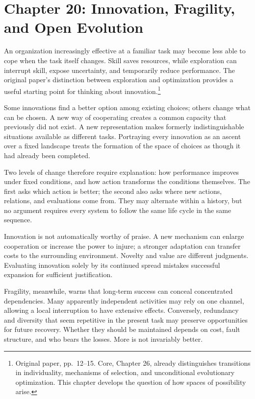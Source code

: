 \documentclass[
  english,
  11pt,
  oneside]{book}
\begin{document}
\par\endgroup

\chapter{Chapter 20: Innovation, Fragility, and Open Evolution}\label{ph-ch-20}

An organization increasingly effective at a familiar task may become less able to cope when the task itself changes. Skill saves resources, while exploration can interrupt skill, expose uncertainty, and temporarily reduce performance. The original paper's distinction between exploration and optimization provides a useful starting point for thinking about innovation.\footnote{\hypertarget{ph-note-50}{}Original paper, pp.~12--15. Core, Chapter 26, already distinguishes transitions in individuality, mechanisms of selection, and unconditional evolutionary optimization. This chapter develops the question of how spaces of possibility arise.}

Some innovations find a better option among existing choices; others change what can be chosen. A new way of cooperating creates a common capacity that previously did not exist. A new representation makes formerly indistinguishable situations available as different tasks. Portraying every innovation as an ascent over a fixed landscape treats the formation of the space of choices as though it had already been completed.

Two levels of change therefore require explanation: how performance improves under fixed conditions, and how action transforms the conditions themselves. The first asks which action is better; the second also asks where new actions, relations, and evaluations come from. They may alternate within a history, but no argument requires every system to follow the same life cycle in the same sequence.

Innovation is not automatically worthy of praise. A new mechanism can enlarge cooperation or increase the power to injure; a stronger adaptation can transfer costs to the surrounding environment. Novelty and value are different judgments. Evaluating innovation solely by its continued spread mistakes successful expansion for sufficient justification.

Fragility, meanwhile, warns that long-term success can conceal concentrated dependencies. Many apparently independent activities may rely on one channel, allowing a local interruption to have extensive effects. Conversely, redundancy and diversity that seem repetitive in the present task may preserve opportunities for future recovery. Whether they should be maintained depends on cost, fault structure, and who bears the losses. More is not invariably better.
\end{document}
